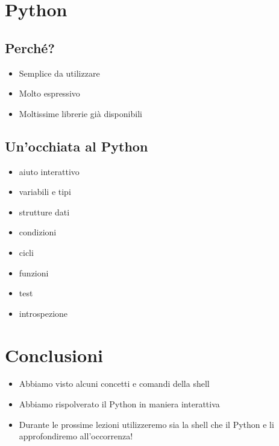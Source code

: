 \documentclass{beamer}
\begin{document}
\section{Python}
\begin{frame}{\insertsection}
\end{frame}

\subsection*{Perché?}
\begin{frame}{\insertsubsection}
\begin{itemize}
\item Semplice da utilizzare
\item Molto espressivo
\item Moltissime librerie già disponibili
\end{itemize}
\end{frame}

\subsection*{Un'occhiata al Python}
\begin{frame}{\insertsubsection}
\begin{itemize}
\item aiuto interattivo
\item variabili e tipi
\item strutture dati
\item condizioni
\item cicli
\item funzioni
\item test
\item introspezione
\end{itemize}
\end{frame}

\section{Conclusioni}
\begin{frame}{\insertsection}
\begin{itemize}
\item Abbiamo visto alcuni concetti e comandi della \alert{shell}
\item Abbiamo rispolverato il \alert{Python} in maniera interattiva
\item Durante le prossime lezioni utilizzeremo sia la shell che il Python e li
approfondiremo all'occorrenza!
\end{itemize}
\end{frame}
\end{document}
